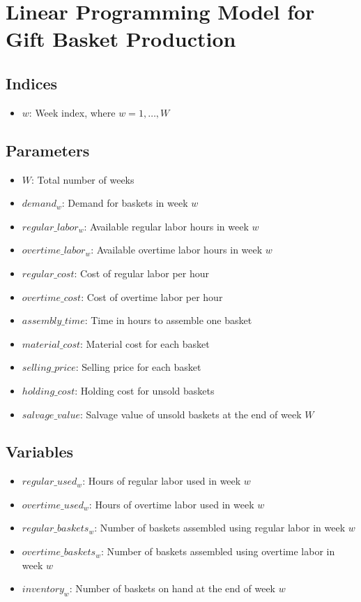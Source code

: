 \documentclass{article}
\begin{document}
\section*{Linear Programming Model for Gift Basket Production}

\subsection*{Indices}
\begin{itemize}
    \item $w$: Week index, where $w = 1, \ldots, W$
\end{itemize}

\subsection*{Parameters}
\begin{itemize}
    \item $W$: Total number of weeks
    \item $demand_{w}$: Demand for baskets in week $w$
    \item $regular\_labor_{w}$: Available regular labor hours in week $w$
    \item $overtime\_labor_{w}$: Available overtime labor hours in week $w$
    \item $regular\_cost$: Cost of regular labor per hour
    \item $overtime\_cost$: Cost of overtime labor per hour
    \item $assembly\_time$: Time in hours to assemble one basket
    \item $material\_cost$: Material cost for each basket
    \item $selling\_price$: Selling price for each basket
    \item $holding\_cost$: Holding cost for unsold baskets
    \item $salvage\_value$: Salvage value of unsold baskets at the end of week $W$
\end{itemize}

\subsection*{Variables}
\begin{itemize}
    \item $regular\_used_{w}$: Hours of regular labor used in week $w$
    \item $overtime\_used_{w}$: Hours of overtime labor used in week $w$
    \item $regular\_baskets_{w}$: Number of baskets assembled using regular labor in week $w$
    \item $overtime\_baskets_{w}$: Number of baskets assembled using overtime labor in week $w$
    \item $inventory_{w}$: Number of baskets on hand at the end of week $w$
\end{itemize}
\end{document}
